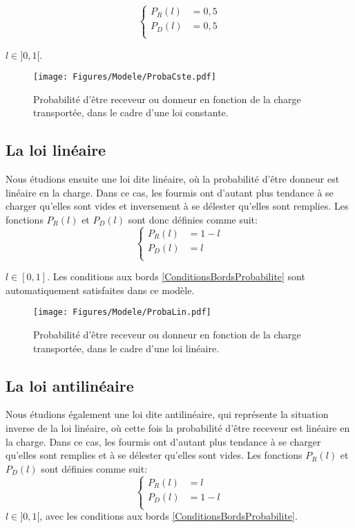 \begin{equation}
\left \{
\begin{aligned}
P_R (l) &= 0,5\\
P_D (l) &= 0,5\\
\end{aligned}
\right.
\label{PRCste}
\end{equation}

$l\in]0,1[$.

\begin{figure}[h]
\centering
\texttt{[image: Figures/Modele/ProbaCste.pdf]}
\caption{Probabilité d'être receveur ou donneur en fonction de la charge transportée, dans le cadre d'une loi constante.}
\label{ProbaCste}
\end{figure}

\subsection{La loi linéaire}
Nous étudions ensuite une loi dite linéaire, où la probabilité d'être donneur est linéaire en la charge. Dans ce cas, les fourmis ont d'autant plus tendance à se charger qu'elles sont vides et inversement à se délester qu'elles sont remplies. Les fonctions $P_R(l)$ et $P_D(l)$ sont donc définies comme suit:
\begin{equation}
\left \{
\begin{aligned}
P_R (l) &= 1-l\\
P_D (l) &= l\\
\end{aligned}
\right.
\label{PRLin}
\end{equation}

$l\in[0,1]$. Les conditions aux bords \ref{ConditionsBordsProbabilite} sont automatiquement satisfaites dans ce modèle.

\begin{figure}[h]
\centering
\texttt{[image: Figures/Modele/ProbaLin.pdf]}
\caption{Probabilité d'être receveur ou donneur en fonction de la charge transportée, dans le cadre d'une loi linéaire.}
\label{ProbaLin}
\end{figure}


\subsection{La loi antilinéaire}
Nous étudions également une loi dite antilinéaire, qui représente la situation inverse de la loi linéaire, où cette fois la probabilité d'être receveur est linéaire en la charge. Dans ce cas, les fourmis ont d'autant plus tendance à se charger qu'elles sont remplies et à se délester qu'elles sont vides. Les fonctions $P_R(l)$ et $P_D(l)$ sont définies comme suit:
\begin{equation}
\left \{
\begin{aligned}
P_R (l) &= l\\
P_D (l) &= 1-l\\
\end{aligned}
\right.
\label{PRAnti}
\end{equation}
$l\in]0,1[$, avec les conditions aux bords \ref{ConditionsBordsProbabilite}.

